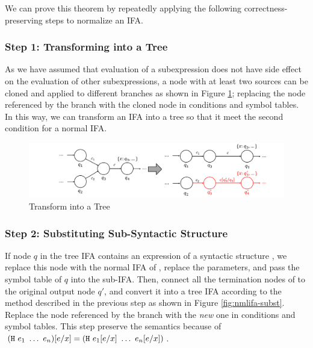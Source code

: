 We can prove this theorem by repeatedly applying the following correctness-preserving steps to normalize an IFA.

\subsubsection*{Step 1: Transforming into a Tree}

As we have assumed that evaluation of a subexpression does not have side effect on the evaluation of other subexpressions, a node with at least two sources can be cloned and applied to different branches as shown in Figure \ref{fig:nmlifa-tree}; replacing the node referenced by the branch with the cloned node in conditions and symbol tables.  In this way, we can transform an IFA into a tree so that it meet the second condition for a  normal IFA.

\begin{figure}[t]
    \centering
    \includegraphics[scale=0.25]{images/nmlifa/nmlifa-tree.png}
    \caption{Transform into a Tree}
    \label{fig:nmlifa-tree}
\end{figure}

\subsubsection*{Step 2: Substituting Sub-Syntactic Structure}
\label{mark:hygieneinderive}

If node $q$ in the tree IFA contains an expression of a syntactic structure , we replace this node with the normal IFA of , replace the parameters, and pass the symbol table of $q$ into the sub-IFA. Then, connect all the termination nodes of  to the original output node $q'$, and convert it into a tree IFA according to the method described in the previous step as shown in Figure \ref{fig:nmlifa-subst}. Replace the node referenced by the branch with the \textit{new} one in conditions and symbol tables. This step preserve the semantics because of $(\mbox{\tt H}~e_1~\ldots~e_n)[e/x] = (\mbox{\tt H}~e_1[e/x]~\ldots~e_n[e/x])$.

